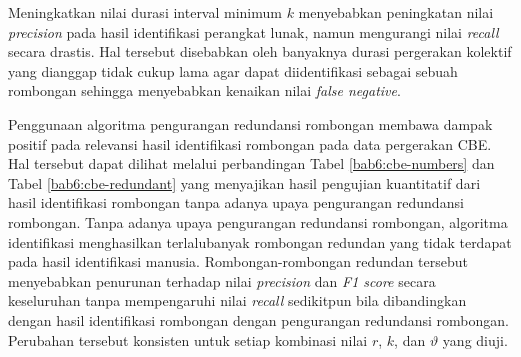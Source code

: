 Meningkatkan nilai durasi interval minimum $k$ menyebabkan peningkatan nilai \textit{precision} pada hasil identifikasi perangkat lunak, namun mengurangi nilai \textit{recall} secara drastis. Hal tersebut disebabkan oleh banyaknya durasi pergerakan kolektif yang dianggap tidak cukup lama agar dapat diidentifikasi sebagai sebuah rombongan sehingga menyebabkan kenaikan nilai \textit{false negative}. 

Penggunaan algoritma pengurangan redundansi rombongan membawa dampak positif pada relevansi hasil identifikasi rombongan pada data pergerakan CBE. Hal tersebut dapat dilihat melalui perbandingan Tabel \ref{bab6:cbe-numbers} dan Tabel \ref{bab6:cbe-redundant} yang menyajikan hasil pengujian kuantitatif dari hasil identifikasi rombongan tanpa adanya upaya pengurangan redundansi rombongan. Tanpa adanya upaya pengurangan redundansi rombongan, algoritma identifikasi menghasilkan terlalubanyak rombongan redundan yang tidak terdapat pada hasil identifikasi manusia. Rombongan-rombongan redundan tersebut menyebabkan penurunan terhadap nilai \textit{precision} dan \textit{F1 score} secara keseluruhan tanpa mempengaruhi nilai \textit{recall} sedikitpun bila dibandingkan dengan hasil identifikasi rombongan dengan pengurangan redundansi rombongan. Perubahan tersebut konsisten untuk setiap kombinasi nilai $r$, $k$, dan $\vartheta$ yang diuji.


